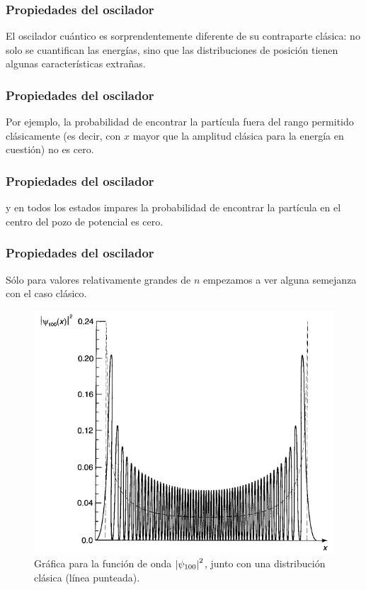 \documentclass[12pt]{beamer}
\begin{document}
\begin{frame}
\frametitle{Propiedades del oscilador}
El oscilador cuántico es sorprendentemente diferente de su contraparte clásica: \pause 
no solo se cuantifican las energías, sino que las distribuciones de posición tienen algunas características extrañas. 
\end{frame}
\begin{frame}
\frametitle{Propiedades del oscilador}
Por ejemplo, la probabilidad de encontrar la partícula fuera del rango permitido clásicamente (es decir, con $x$ mayor que la amplitud clásica para la energía en cuestión) no es cero.
\end{frame}
\begin{frame}
\frametitle{Propiedades del oscilador}
\pause y en todos los estados impares la probabilidad de encontrar la partícula en el centro del pozo de potencial es cero.
\end{frame}
\begin{frame}
\frametitle{Propiedades del oscilador}    
Sólo para valores relativamente grandes de $n$ empezamos a ver alguna semejanza con el caso clásico. 
\end{frame}
\begin{frame}[plain]
\begin{figure}[H]
    \centering
    \includegraphics[scale=0.35]{Imagenes/Funcion_Onda_100.png}
    \caption{Gráfica para la función de onda $\abs{\psi_{100}}^{2}$, junto con una distribución clásica (línea punteada).}
    \label{figura_005}
\end{figure}
\end{frame}
\end{document}
